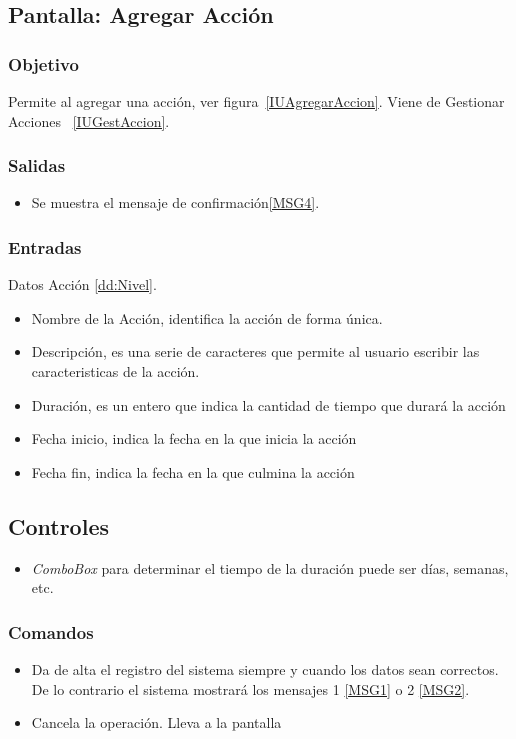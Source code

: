 \subsection{Pantalla: Agregar Acción}

\subsubsection{Objetivo}
Permite al agregar una acción, ver figura~\ref{IUAgregarAccion}. Viene de Gestionar Acciones ~\ref{IUGestAccion}.


\subsubsection{Salidas}
\begin{itemize}
 \item Se muestra el mensaje de confirmación\ref{MSG4}.
 \end{itemize}

\subsubsection{Entradas}
Datos Acción \ref{dd:Nivel}.
\begin{itemize}
 \item Nombre de la Acción, identifica la acción de forma única.
 \item Descripción, es una serie de caracteres que permite al usuario escribir las caracteristicas de la acción.
 \item Duración, es un entero que indica la cantidad de tiempo que durará la acción
 \item Fecha inicio, indica la fecha en la que inicia la acción
 \item Fecha fin, indica la fecha en la que culmina la acción

\end{itemize}

\subsection{Controles}
\begin{itemize}
 \item \textit{ComboBox} para determinar el tiempo de la duración puede ser días, semanas, etc.
\end{itemize}

\subsubsection{Comandos}
\begin{itemize}
 \item {} Da de alta el registro del sistema siempre y cuando los datos sean correctos. De lo contrario el sistema mostrará los mensajes 1 \ref{MSG1} o 2 \ref{MSG2}.
 \item {} Cancela la operación. Lleva a la pantalla 
\end{itemize}

